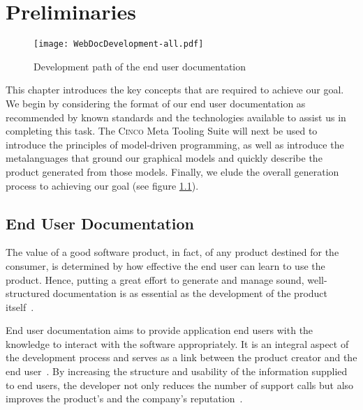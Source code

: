 
\chapter{Preliminaries}\label{ch:Basis}

\begin{figure}[t]
    \centering
    \texttt{[image: WebDocDevelopment-all.pdf]}
    \caption{Development path of the end user documentation}
    \label{fig:procWorkflow}
\end{figure}

This chapter introduces the key concepts that are required to achieve our goal. We begin by considering the format of our end user documentation as recommended by known standards and the technologies available to assist us in completing this task. The \textsc{Cinco} Meta Tooling Suite will next be used to introduce the principles of model-driven programming, as well as introduce the metalanguages that ground our graphical models and quickly describe the product generated from those models. Finally, we elude the overall generation process to achieving our goal (see figure \ref{fig:procWorkflow}).

\pagebreak

\section{End User Documentation}\label{sec:endUserDoc}

The value of a good software product, in fact, of any product destined for the consumer, is determined by how effective the end user can learn to use the product. Hence, putting a great effort to generate and manage sound, well-structured documentation is as essential as the development of the product itself~\cite{ISO-IEC-IEEE}. 

End user documentation aims to provide application end users with the knowledge to interact with the software appropriately. It is an integral aspect of the development process and serves as a link between the product creator and the end user~\cite{9238529}. By increasing the structure and usability of the information supplied to end users, the developer not only reduces the number of support calls but also improves the product's and the company's reputation~\cite{ieee5712775}.


